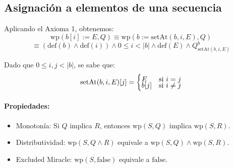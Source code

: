 \documentclass[9pt]{extarticle}  %
\newcommand{\smalltable}{\fontsize{8pt}{10pt}\selectfont}
\begin{document}
\subsection*{\tiny{Asignación a elementos de una secuencia}}
\noindent\smalltable
\vspace{-0.3cm}
Aplicando el Axioma 1, obtenemos:
\[ \text{wp}(b[i] := E, Q) \equiv \text{wp}(b := \text{setAt}(b, i, E), Q) \]
\[ \equiv (\text{def}(b) \land \text{def}(i)) \land 0 \leq i < |b| \land \text{def}(E) \land Q_{\text{setAt}(b,i,E)}^b \]

Dado que \( 0 \leq i, j < |b| \), se sabe que:
\[ \text{setAt}(b, i, E)[j] = 
\begin{cases} 
\vspace{-0.2cm}
E & \text{si } i = j \\
b[j] & \text{si } i \neq j 
\end{cases} 
\]

\vspace{-0.4cm}
\vspace{-0.5cm}
\paragraph*{Propiedades:}
\begin{itemize}
\vspace{-0.32cm}
    \item Monotonía: Si \( Q \) implica \( R \), entonces \( \text{wp}(S, Q) \) implica \( \text{wp}(S, R) \).
    \vspace{-0.32cm}
    \item Distributividad: \( \text{wp}(S, Q \land R) \) equivale a \( \text{wp}(S, Q) \land \text{wp}(S, R) \).
    \vspace{-0.32cm}
    \item Excluded Miracle: \( \text{wp}(S, \text{false}) \) equivale a \( \text{false} \).
\end{itemize}
\vspace{-0.67cm}
\end{document}

